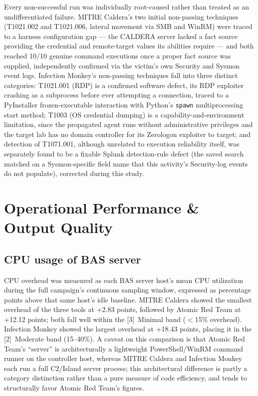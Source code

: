 Every non-successful run was individually root-caused rather than treated as an undifferentiated failure. MITRE Caldera's two initial non-passing techniques (T1021.002 and T1021.006, lateral movement via SMB and WinRM) were traced to a harness configuration gap --- the CALDERA server lacked a fact source providing the credential and remote-target values its abilities require --- and both reached 10/10 genuine command executions once a proper fact source was supplied, independently confirmed via the victim's own Security and Sysmon event logs. Infection Monkey's non-passing techniques fall into three distinct categories: T1021.001 (RDP) is a confirmed software defect, its RDP exploiter crashing as a subprocess before ever attempting a connection, traced to a PyInstaller frozen-executable interaction with Python's \texttt{spawn} multiprocessing start method; T1003 (OS credential dumping) is a capability-and-environment limitation, since the propagated agent runs without administrative privileges and the target lab has no domain controller for its Zerologon exploiter to target; and detection of T1071.001, although unrelated to execution reliability itself, was separately found to be a fixable Splunk detection-rule defect (the saved search matched on a Sysmon-specific field name that this activity's Security-log events do not populate), corrected during this study.


\section{Operational Performance \& Output Quality}\label{sec:Matrix4}

\subsection{CPU usage of BAS server }\label{sec:Matrix4_4_1}

CPU overhead was measured as each BAS server host's mean CPU utilization during the full campaign's continuous sampling window, expressed as percentage points above that same host's idle baseline. MITRE Caldera showed the smallest overhead of the three tools at +2.83 points, followed by Atomic Red Team at +12.12 points; both fall well within the [3]~Minimal band ($<$15\% overhead). Infection Monkey showed the largest overhead at +18.43 points, placing it in the [2]~Moderate band (15--40\%). A caveat on this comparison is that Atomic Red Team's ``server'' is architecturally a lightweight PowerShell/WinRM command runner on the controller host, whereas MITRE Caldera and Infection Monkey each run a full C2/Island server process; this architectural difference is partly a category distinction rather than a pure measure of code efficiency, and tends to structurally favor Atomic Red Team's figures.

